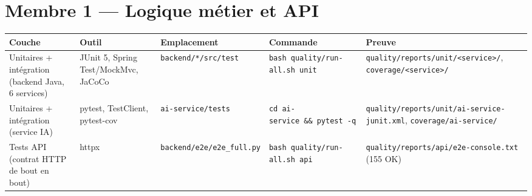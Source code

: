 \documentclass[
  11pt,
]{article}
\begin{document}
\section{Membre 1 --- Logique métier et
API}\label{membre-1--logique-muxe9tier-et-api}

\begin{longtable}[]{@{}
  >{\raggedright\arraybackslash}p{}
  >{\raggedright\arraybackslash}p{}
  >{\raggedright\arraybackslash}p{}
  >{\raggedright\arraybackslash}p{}
  >{\raggedright\arraybackslash}p{}@{}}
\toprule\noalign{}
\begin{minipage}[b]{\linewidth}\raggedright
Couche
\end{minipage} & \begin{minipage}[b]{\linewidth}\raggedright
Outil
\end{minipage} & \begin{minipage}[b]{\linewidth}\raggedright
Emplacement
\end{minipage} & \begin{minipage}[b]{\linewidth}\raggedright
Commande
\end{minipage} & \begin{minipage}[b]{\linewidth}\raggedright
Preuve
\end{minipage} \\
\midrule\noalign{}
\endhead
\bottomrule\noalign{}
\endlastfoot
Unitaires + intégration (backend Java, 6 services) & JUnit 5, Spring
Test/MockMvc, JaCoCo & \texttt{backend/*/src/test} &
\texttt{bash\ quality/}\allowbreak{}\texttt{run-}\allowbreak{}\texttt{all.}\allowbreak{}\texttt{sh\ unit}
&
\texttt{quality/}\allowbreak{}\texttt{reports/}\allowbreak{}\texttt{unit/}\allowbreak{}\texttt{\textless{}service\textgreater{}/}\allowbreak{},
\texttt{coverage/\textless{}service\textgreater{}/} \\
Unitaires + intégration (service IA) & pytest, TestClient, pytest-cov &
\texttt{ai-service/tests} &
\texttt{cd\ ai-}\allowbreak{}\texttt{service\ \&\&\ pytest\ -}\allowbreak{}\texttt{q}
&
\texttt{quality/}\allowbreak{}\texttt{reports/}\allowbreak{}\texttt{unit/}\allowbreak{}\texttt{ai-}\allowbreak{}\texttt{service-}\allowbreak{}\texttt{junit.}\allowbreak{}\texttt{xml},
\texttt{coverage/}\allowbreak{}\texttt{ai-}\allowbreak{}\texttt{service/}\allowbreak{} \\
Tests API (contrat HTTP de bout en bout) & httpx &
\texttt{backend/}\allowbreak{}\texttt{e2e/}\allowbreak{}\texttt{e2e\_}\allowbreak{}\texttt{full.}\allowbreak{}\texttt{py}
&
\texttt{bash\ quality/}\allowbreak{}\texttt{run-}\allowbreak{}\texttt{all.}\allowbreak{}\texttt{sh\ api}
&
\texttt{quality/}\allowbreak{}\texttt{reports/}\allowbreak{}\texttt{api/}\allowbreak{}\texttt{e2e-}\allowbreak{}\texttt{console.}\allowbreak{}\texttt{txt}
(155 OK) \\
\end{longtable}
\end{document}

